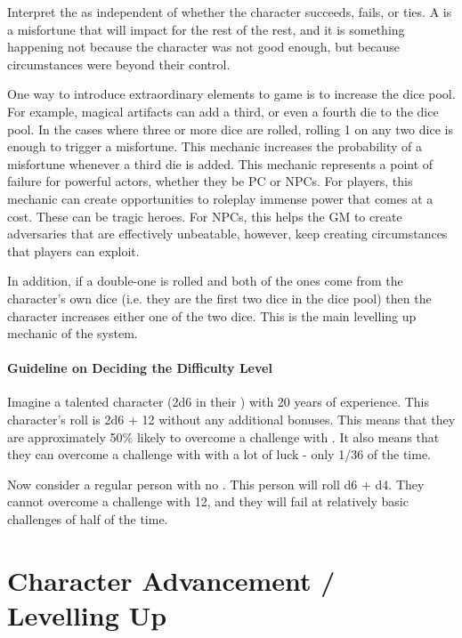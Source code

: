 Interpret the  as independent of whether the character
succeeds, fails, or ties. A  is a misfortune that will
impact for the rest of the rest, and it is something happening not
because the character was not good enough, but because circumstances were
beyond their control.

One way to introduce extraordinary elements to game is to increase the dice pool.
For example, magical artifacts can add a third, or even a fourth die to the dice pool.
In the cases where three or more dice are rolled,
rolling 1 on any two dice is enough to trigger a misfortune.
This mechanic increases the probability of a misfortune
whenever a third die is added. This mechanic represents
a point of failure for powerful actors, whether they be
PC or NPCs. For players, this mechanic can create
opportunities to roleplay immense power that comes at a cost.
These can be tragic heroes. For NPCs, this helps the GM
to create adversaries that are effectively unbeatable,
however, keep creating circumstances that players can exploit.

In addition, if a double-one is rolled and both of the ones
come from the character's own dice (i.e. they are the first
two dice in the dice pool) then the character increases either
one of the two dice. This is the main levelling up mechanic of
the system.


\paragraph*{Guideline on Deciding the Difficulty Level}

Imagine a talented character (2d6 in their ) with 20 years of experience.
This character's roll is 2d6 + 12 without any additional bonuses.
This means that they are approximately 50\% likely to overcome a challenge with .
It also means that they can overcome a challenge with  with a lot of luck - only 1/36 of the time.\\

\marginpar{
	\footnotesize
	
}

Now consider a regular person with no . This person will roll d6 + d4.
They cannot overcome a challenge with 12,
and they will fail at relatively basic challenges of  half of the time.

\section{Character Advancement / Levelling Up}

